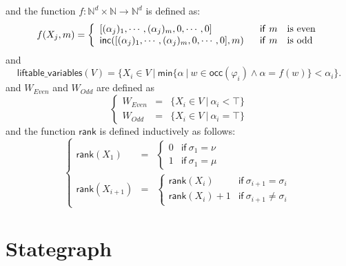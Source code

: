 \documentclass{article}
\begin{document}
and the function $f:\mathbb{N}^{d}\times \mathbb{N}\rightarrow \mathbb{N}%
^{d} $ is defined as:%
\begin{equation*}
f(X_{j},m)=\left\{ 
\begin{array}{ll}
\lbrack (\mathcal{\alpha }_{j})_{1},\cdots ,(\mathcal{\alpha }%
_{j})_{m},0,\cdots ,0] & \text{\textsf{if}}\ m\text{ is even} \\ 
\mathsf{inc}([(\mathcal{\alpha }_{j})_{1},\cdots ,(\mathcal{\alpha }%
_{j})_{m},0,\cdots ,0],m) & \text{\textsf{if}}\ m\text{ is odd}%
\end{array}%
\right.
\end{equation*}%
and%
\begin{equation*}
\mathsf{liftable\_variables}(V)=\{X_{i}\in V\ |\ \mathsf{min}\{\alpha \ |\
w\in \mathsf{\mathsf{occ}}(\varphi _{i})\wedge \alpha =f(w)\}\mathsf{<}%
\mathcal{\alpha }_{i}\}.
\end{equation*}%
and $W_{Even}$ and $W_{Odd}$ are defined as%
\begin{equation*}
\left\{ 
\begin{array}{lll}
W_{Even} & = & \{X_{i}\in V\ |\ \mathcal{\alpha }_{i}<\top \} \\ 
W_{Odd} & = & \{X_{i}\in V\ |\ \mathcal{\alpha }_{i}=\top \}%
\end{array}%
\right.
\end{equation*}%
and the function $\mathsf{rank}$ is defined inductively as follows:%
\begin{equation*}
\left\{ 
\begin{array}{lll}
\mathsf{rank}(X_{1}) & = & \left\{ 
\begin{array}{ll}
0 & \mathsf{if}\ \sigma _{1}=\nu \\ 
1 & \mathsf{if}\ \sigma _{1}=\mu%
\end{array}%
\right. \\ 
\mathsf{rank}(X_{i+1}) & = & \left\{ 
\begin{array}{ll}
\mathsf{rank}(X_{i}) & \mathsf{if}\ \sigma _{i+1}=\sigma _{i} \\ 
\mathsf{rank}(X_{i})+1 & \mathsf{if}\ \sigma _{i+1}\neq \sigma _{i}%
\end{array}%
\right.%
\end{array}%
\right.
\end{equation*}

\newpage

\section{Stategraph}
\end{document}

